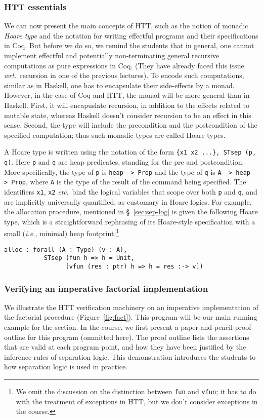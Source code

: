 \documentclass[blockstyle,preprint,nocopyrightspace]{sigplanconf}
\newcommand{\code}[1]{\lstinline{#1}}
\newcommand{\etc}{\emph{etc}}
\newcommand{\ie}{\emph{i.e.}\xspace}
\newcommand{\wrt}{\emph{wrt.}\xspace}
\begin{document}
\subsubsection{HTT essentials}
\label{sec:htt-essentials}
We can now present the main concepts of HTT, such as the notion of
monadic \emph{Hoare type} and the notation for writing effectful
programs and their specifications in Coq.
%
But before we do so, we remind the students that in general, one
cannot implement effectful and potentially non-terminating general
recursive computations as pure expressions in Coq. (They have already
faced this issue \wrt~recursion in one of the previous lectures). To
encode such computations, similar as in Haskell, one has to
encapsulate their side-effects by a monad. However, in the case of Coq
and HTT, the monad will be more general than in Haskell. First, it
will encapuslate recursion, in addition to the effects related to
mutable state, whereas Haskell doesn't consider recursion to be an
effect in this sense. Second, the type will include the precondition
and the postcondition of the specified computation; thus such monadic
types are called Hoare types.

A Hoare type is written using the notation of the form
\texttt{\small\{x1 x2 ...\}, STsep (p, q)}. Here \code{p} and \code{q}
are heap predicates, standing for the pre and postcondition. More
specifically, the type of \code{p} is \code{heap -> Prop} and the type
of \code{q} is \code{A -> heap -> Prop}, where \code{A} is the type of
the result of the command being specified. The identifiers \code{x1},
\code{x2} \etc.~bind the logical variables that scope over both
\code{p} and \code{q}, and are implicitly universally quantified, as
customary in Hoare logics. For example, the allocation procedure,
mentioned in \S~\ref{sec:sep-log} is given the following Hoare type,
which is a straightforward rephrasing of its Hoare-style specification
with a small (\ie, minimal) heap footprint:\footnote{We omit the
  discussion on the distinction between \code{fun} and \code{vfun}; it
  has to do with the treatment of exceptions in HTT, but we don't
  consider exceptions in the course.}


\begin{lstlisting}
alloc : forall (A : Type) (v : A),
           STsep (fun h => h = Unit,
                 [vfun (res : ptr) h => h = res :-> v])
\end{lstlisting}
%

\subsubsection{Verifying an imperative factorial implementation}
\label{sec:verify-an-imper}
We illustrate the HTT verification machinery on an imperative
implementation of the factorial procedure
(Figure~\ref{fig:fact}). This program will be our main running example
for the section. In the course, we first present a paper-and-pencil
proof outline for this program (ommitted here). The proof outline
lists the assertions that are valid at each program point, and how
they have been justified by the inference rules of separation
logic. This demonstration introduces the students to how separation
logic is used in practice.
\end{document}
